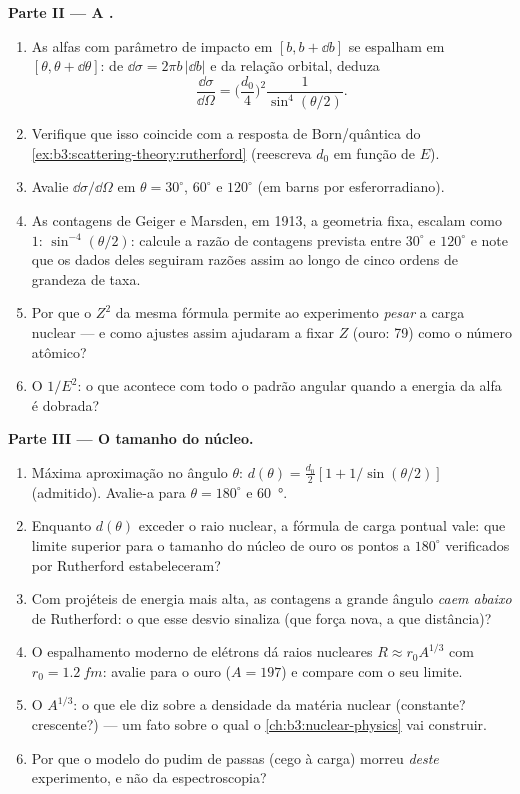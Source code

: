 \begin{problem}
\medskip\noindent\textbf{Parte II --- A .}
\begin{enumerate}[resume]
  \item As alfas com parâmetro de impacto em $[b, b + \dd b]$ se
        espalham em $[\theta, \theta + \dd\theta]$: de $\dd\sigma =
        2\pi b\,|\dd b|$ e da relação orbital, deduza
        \[
        \frac{\dd\sigma}{\dd\Omega} =
        \Big(\frac{d_0}{4}\Big)^2\frac{1}{\sin^4(\theta/2)} .
        \]
  \item Verifique que isso coincide com a resposta de Born/quântica do
        \cref{ex:b3:scattering-theory:rutherford} (reescreva $d_0$ em
        função de $E$).
  \item Avalie $\dd\sigma/\dd\Omega$ em $\theta = 30^\circ$,
        $60^\circ$ e $120^\circ$ (em barns por esferorradiano).
  \item As contagens de Geiger e Marsden, em 1913, a geometria fixa,
        escalam como $1{:}\,\sin^{-4}(\theta/2)$: calcule a razão de
        contagens prevista entre $30^\circ$ e $120^\circ$ e note que
        os dados deles seguiram razões assim ao longo de cinco ordens
        de grandeza de taxa.
  \item Por que o $Z^2$ da mesma fórmula permite ao experimento
        \emph{pesar} a carga nuclear --- e como ajustes assim
        ajudaram a fixar $Z$ (ouro: 79) como o número atômico?
  \item O $1/E^2$: o que acontece com todo o padrão angular quando a
        energia da alfa é dobrada?
\end{enumerate}

\medskip\noindent\textbf{Parte III --- O tamanho do núcleo.}
\begin{enumerate}[resume]
  \item Máxima aproximação no ângulo $\theta$: $d(\theta) =
        \tfrac{d_0}2[1 + 1/\sin(\theta/2)]$ (admitido). Avalie-a para
        $\theta = 180^\circ$ e \qty{60}{\degree}.
  \item Enquanto $d(\theta)$ exceder o raio nuclear, a fórmula de carga
        pontual vale: que limite superior para o tamanho do núcleo de
        ouro os pontos a $180^\circ$ verificados por Rutherford
        estabeleceram?
  \item Com projéteis de energia mais alta, as contagens a grande
        ângulo \emph{caem abaixo} de Rutherford: o que esse desvio
        sinaliza (que força nova, a que distância)?
  \item O espalhamento moderno de elétrons dá raios nucleares $R
        \approx r_0A^{1/3}$ com $r_0 = \qty{1.2}{fm}$: avalie para o
        ouro ($A = 197$) e compare com o seu limite.
  \item O $A^{1/3}$: o que ele diz sobre a densidade da matéria nuclear
        (constante? crescente?) --- um fato sobre o qual o
        \cref{ch:b3:nuclear-physics} vai construir.
  \item Por que o modelo do pudim de passas (cego à carga) morreu
        \emph{deste} experimento, e não da espectroscopia?
\end{enumerate}


\end{problem}
